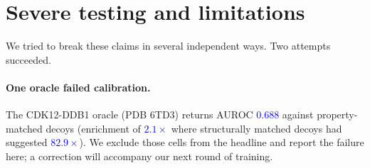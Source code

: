 \documentclass{article}
\newcommand{\checkval}[1]{\textcolor{blue}{#1}}
\begin{document}




\section{Severe testing and limitations}
\label{sec:severe}

We tried to break these claims in several independent ways. Two attempts succeeded.

\paragraph{One oracle failed calibration.}
The CDK12-DDB1 oracle (PDB 6TD3) returns AUROC \checkval{0.688} against property-matched decoys (enrichment of \checkval{$2.1\times$} where structurally matched decoys had
suggested \checkval{$82.9\times$}). We exclude those cells from the headline and report the failure here; a correction will accompany our next round of training.
\end{document}
